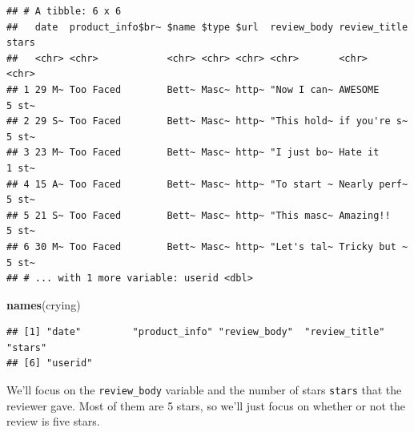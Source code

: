 \documentclass[
]{book}
\newenvironment{Shaded}{\begin{snugshade}}{\end{snugshade}}
\newcommand{\CommentTok}[1]{\textcolor[rgb]{0.56,0.35,0.01}{\textit{#1}}}
\newcommand{\DataTypeTok}[1]{\textcolor[rgb]{0.13,0.29,0.53}{#1}}
\newcommand{\DecValTok}[1]{\textcolor[rgb]{0.00,0.00,0.81}{#1}}
\newcommand{\KeywordTok}[1]{\textcolor[rgb]{0.13,0.29,0.53}{\textbf{#1}}}
\newcommand{\NormalTok}[1]{#1}
\newcommand{\OperatorTok}[1]{\textcolor[rgb]{0.81,0.36,0.00}{\textbf{#1}}}
\newcommand{\StringTok}[1]{\textcolor[rgb]{0.31,0.60,0.02}{#1}}
\begin{document}
\begin{verbatim}
## # A tibble: 6 x 6
##   date  product_info$br~ $name $type $url  review_body review_title stars
##   <chr> <chr>            <chr> <chr> <chr> <chr>       <chr>        <chr>
## 1 29 M~ Too Faced        Bett~ Masc~ http~ "Now I can~ AWESOME      5 st~
## 2 29 S~ Too Faced        Bett~ Masc~ http~ "This hold~ if you're s~ 5 st~
## 3 23 M~ Too Faced        Bett~ Masc~ http~ "I just bo~ Hate it      1 st~
## 4 15 A~ Too Faced        Bett~ Masc~ http~ "To start ~ Nearly perf~ 5 st~
## 5 21 S~ Too Faced        Bett~ Masc~ http~ "This masc~ Amazing!!    5 st~
## 6 30 M~ Too Faced        Bett~ Masc~ http~ "Let's tal~ Tricky but ~ 5 st~
## # ... with 1 more variable: userid <dbl>
\end{verbatim}

\begin{Shaded}
\begin{Highlighting}[]
\KeywordTok{names}\NormalTok{(crying)}
\end{Highlighting}
\end{Shaded}

\begin{verbatim}
## [1] "date"         "product_info" "review_body"  "review_title" "stars"       
## [6] "userid"
\end{verbatim}

We'll focus on the \texttt{review\_body} variable and the number of stars \texttt{stars} that the reviewer gave. Most of them are 5 stars, so we'll just focus on whether or not the review is five stars.

\begin{Shaded}
\end{Shaded}
\end{document}
